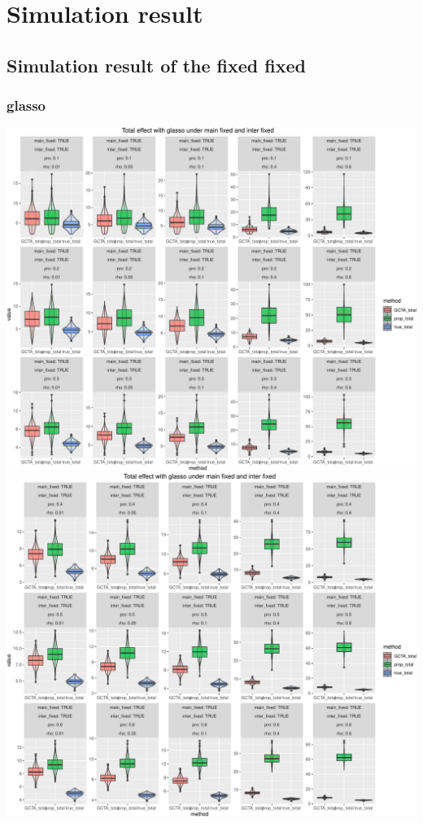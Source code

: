 \documentclass[]{article}
\begin{document}
\section{Simulation result}\label{simulation-result}

\subsection{Simulation result of the fixed
fixed}\label{simulation-result-of-the-fixed-fixed}

\subsubsection{glasso}\label{glasso}

\includegraphics{Simulation_report_glasso_files/figure-latex/fixed fixed total glasso-1.pdf}
\includegraphics{Simulation_report_glasso_files/figure-latex/fixed fixed total glasso-2.pdf}
\end{document}
